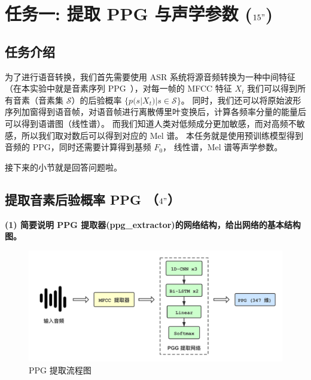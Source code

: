 \documentclass[degree=project,degree-type=project,cjk-font=noto]{thuthesis}
\begin{document}
\maketitle

\frontmatter
% 

\tableofcontents

\listoffigures           %

\mainmatter

\chapter{任务一: 提取 PPG 与声学参数 ($15"$)}

\section{任务介绍}

为了进行语音转换，我们首先需要使用 ASR 系统将源音频转换为一种中间特征（在本实验中就是音素序列 PPG~\cite{PPG}），对每一帧的 MFCC 特征 $X_t$ 我们可以得到所有音素（音素集 $\mathcal{S}$）的后验概率 $\{p(s | X_t) | s \in \mathcal{S}\}$。
同时，我们还可以将原始波形序列加窗得到语音帧，对语音帧进行离散傅里叶变换后，计算各频率分量的能量后可以得到语谱图（线性谱）。
而我们知道人类对低频成分更加敏感，而对高频不敏感，所以我们取对数后可以得到对应的 Mel 谱。
本任务就是使用预训练模型得到音频的 PPG，同时还需要计算得到基频 $F_0$， 线性谱，Mel 谱等声学参数。

接下来的小节就是回答问题啦。

\section{提取音素后验概率 PPG （$4"$）}

\textbf{(1) 简要说明 PPG 提取器(ppg\_extractor)的网络结构，给出网络的基本结构图。}

\begin{figure}[!htp]
\centering%
\includegraphics[width=.8\linewidth]{PPG.png}
  \caption{PPG 提取流程图}
  \label{fig:ppg}
\end{figure}
\end{document}
